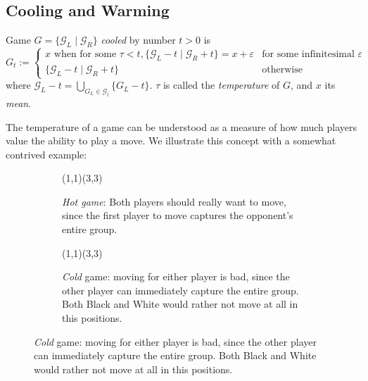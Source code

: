 \documentclass[../math194_paper.tex]{subfiles}
\begin{document}
\subsection{Cooling and Warming}

\begin{definition}[Cooling] Game $G = \{\mathcal{G}_L \mid \mathcal{G}_R\}$ 
\textit{cooled} by number $t>0$ is 
\[ G_t := \begin{cases}
    x \text{ when for some } \tau < t, \{\mathcal{G}_L-t \mid \mathcal{G}_R+t\} = x + \varepsilon &\text{for some infinitesimal } \varepsilon \\
    \{\mathcal{G}_L-t \mid \mathcal{G}_R+t\} &\text{otherwise}
\end{cases}
\]
where $\mathcal{G}_L-t = \bigcup_{G_L \in \mathcal{G}_l} \{G_L-t\}$.
$\tau$ is called the \textit{temperature} of $G$, and $x$ its \textit{mean}.
\end{definition}

The temperature of a game can be understood as a measure of
how much players value the ability to play a move. We illustrate this concept 
with a somewhat contrived example:

\begin{figure}[H]
\begin{subfigure}[b]{0.45\linewidth}
\centering
\begin{psgopartialboard*}{(1,1)(3,3)}
\end{psgopartialboard*}
\caption{
    \textit{Hot game}: Both players should really want to move, since 
    the first player to move captures the opponent's entire group.
}
\end{subfigure}
\quad
\begin{subfigure}[b]{0.45\linewidth}
\centering
\begin{psgopartialboard*}{(1,1)(3,3)}
\end{psgopartialboard*}
\caption{
   \textit{Cold} game: moving for either player is bad, since the other player can immediately
   capture the entire group. Both Black and White would rather 
   not move at all in this positions.
}
\end{subfigure}
\end{figure}
\end{document}
